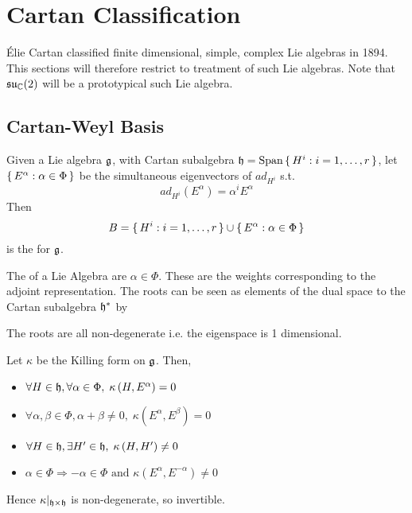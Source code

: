 \documentclass{article}
\begin{document}
\section{Cartan Classification}
\'Elie Cartan classified finite dimensional, simple, complex Lie algebras in 1894. This sections will therefore restrict to treatment of such Lie algebras. Note that $\mathfrak{su}_{\mathbb{C}}(2)$ will be a prototypical such Lie algebra. 



\subsection{Cartan-Weyl Basis}

\begin{definition}
	Given a Lie algebra $\mathfrak{g}$, with Cartan subalgebra $\mathfrak{h}=\operatorname{Span}\set{ H^i : i=1,\dots,r }$, let $\set{  E^\alpha : \alpha\in\Phi  }$ be the simultaneous eigenvectors of $ad_{H^i}$ s.t. 
	\[
	ad_{H^i}\left(E^\alpha \right)=\alpha^i E^\alpha
	\]
	Then 
	\[
	B=\set{  H^i : i=1,\dots,r } \cup \set{  E^\alpha : \alpha\in\Phi  }
	\]
	is the  for $\mathfrak{g}$.
\end{definition}



\begin{definition}[Roots]
	The  of a Lie Algebra are $\alpha\in\Phi$.
	These are the weights corresponding to the adjoint representation. The roots can be seen as elements of the dual space to the Cartan subalgebra $\mathfrak{h}^\ast$ by 
\end{definition}

\begin{fact}
	The roots are all non-degenerate i.e. the eigenspace is 1 dimensional. 
\end{fact}

\begin{theorem}
	Let $\kappa$ be the Killing form on $\mathfrak{g}$. Then, 
	\begin{itemize}
		\item $\forall H\in\mathfrak{h}, \forall\alpha\in\Phi, \; \kappa\left(H,E^\alpha\right)=0 $
		\item $\forall\alpha,\beta\in\Phi, \alpha+\beta\neq0, \; \kappa\left(E^\alpha,E^\beta\right)=0$
		\item $\forall H\in\mathfrak{h}, \exists H^\prime\in\mathfrak{h}, \; \kappa\left(H,H^\prime\right)\neq0$
		\item $\alpha\in\Phi \Rightarrow -\alpha\in\Phi \text{ and } \kappa\left(E^\alpha,E^{-\alpha}\right)\neq0$
	\end{itemize}
	Hence $\kappa|_{\mathfrak{h}\times\mathfrak{h}}$ is non-degenerate, so invertible. 
\end{theorem}
\end{document}

